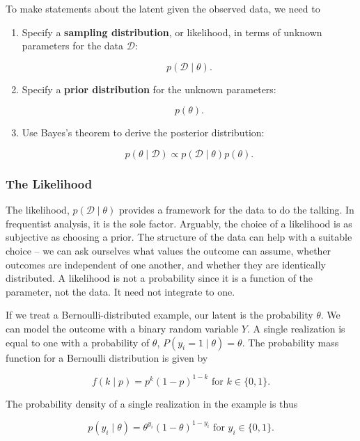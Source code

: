 To make statements about the latent given the observed data, we need to

\begin{enumerate}
	\item Specify a \textbf{sampling distribution}, or likelihood, in terms of unknown parameters for the data $\mathcal{D}$:
	
	\[
		p(\mathcal{D}\mid \theta).
	\]
	
	\item Specify a \textbf{prior distribution} for the unknown parameters:
	
	\[
		p(\theta).
	\]
	
	\item Use Bayes's theorem to derive the posterior distribution:
	
	\[
		p(\theta\mid\mathcal{D})\propto p(\mathcal{D}\mid\theta)p(\theta). 
	\]
\end{enumerate}

\subsubsection{The Likelihood}

The likelihood, $p(\mathcal{D}\mid\theta)$ provides a framework for the data to do the talking. In frequentist analysis, it is the sole factor. Arguably, the choice of a likelihood is as subjective as choosing a prior. The structure of the data can help with a suitable choice -- we can ask ourselves what values the outcome can assume, whether outcomes are independent of one another, and whether they are identically distributed. A likelihood is not a probability since it is a function of the parameter, not the data. It need not integrate to one.

If we treat a Bernoulli-distributed example, our latent is the probability $\theta$. We can model the outcome with a binary random variable $Y$. A single realization is equal to one with a probability of $\theta$, $P(y_i = 1\mid \theta) = \theta$. The probability mass function for a Bernoulli distribution is given by

\begin{equation}
	f(k\mid p ) = p^k(1-p)^{1-k} \text{ for }k \in\{0,1\}.
\end{equation} 

The probability density of a single realization in the example is thus

\[
	p(y_i \mid \theta ) = \theta^{y_i}(1-\theta)^{1-y_i}\text{ for } y_i \in \{0,1\}.
\]

